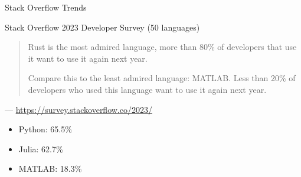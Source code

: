 \documentclass[
    xcolor={svgnames,dvipsnames},
    hyperref={colorlinks, citecolor=DeepPink4, linkcolor=DarkRed, urlcolor=DarkBlue}
    ]{beamer}  %
\newcommand{\1}{\mathbbm 1}
\begin{document}
\begin{frame}

    Stack Overflow Trends

    \begin{figure}
       \begin{center}
       \end{center}
    \end{figure}

\end{frame}


\begin{frame}

    Stack Overflow 2023 Developer Survey (50 languages)

    \vspace{0.5em}
    \vspace{0.5em}
    \vspace{0.5em}
    
    \begin{quote}
        Rust is the most admired language, more than 80\% of developers that use it
        want to use it again next year.

        \vspace{0.5em}
        \vspace{0.5em}
        Compare this to the least admired language:
        MATLAB. Less than 20\% of developers who used this language want to use it again next year.
    \end{quote}

    \hspace*{\fill}--- \url{https://survey.stackoverflow.co/2023/}

        \vspace{0.5em}
        \vspace{0.5em}

    \begin{itemize}
        \item Python: 65.5\%
        \item Julia: 62.7\%
        \item MATLAB: 18.3\%
    \end{itemize}

\end{frame}
\end{document}
